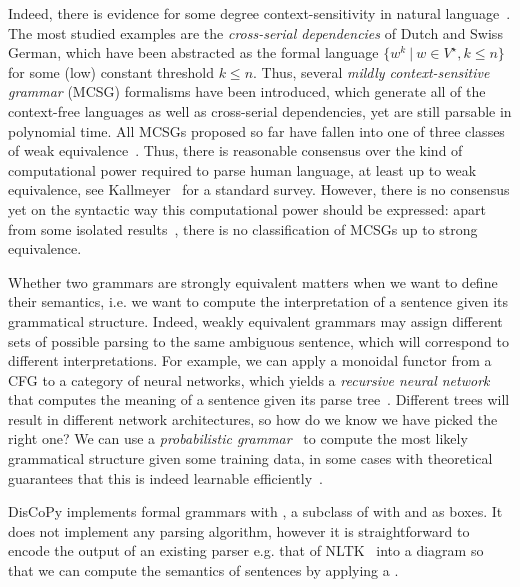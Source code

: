 Indeed, there is evidence for some degree context-sensitivity in natural language~\cite{Huybregts84,Shieber85}.
The most studied examples are the \emph{cross-serial dependencies} of Dutch and Swiss German, which have been abstracted as the formal language $\{ w^k \ \vert \ w \in V^\star, k \leq n \}$ for some (low) constant threshold $k \leq n$.
Thus, several \emph{mildly context-sensitive grammar} (MCSG) formalisms have been introduced, which generate all of the context-free languages as well as cross-serial dependencies, yet are still parsable in polynomial time.
All MCSGs proposed so far have fallen into one of three classes of weak equivalence~\cite{Weir88}.
Thus, there is reasonable consensus over the kind of computational power required to parse human language, at least up to weak equivalence, see Kallmeyer~\cite{Kallmeyer10} for a standard survey.
However, there is no consensus yet on the syntactic way this computational power should be expressed: apart from some isolated results~\cite{SchifferMaletti21}, there is no classification of MCSGs up to strong equivalence.

Whether two grammars are strongly equivalent matters when we want to define their semantics, i.e. we want to compute the interpretation of a sentence given its grammatical structure.
Indeed, weakly equivalent grammars may assign different sets of possible parsing to the same ambiguous sentence, which will correspond to different interpretations.
For example, we can apply a monoidal functor from a CFG to a category of neural networks, which yields a \emph{recursive neural network} that computes the meaning of a sentence given its parse tree~\cite{SocherEtAl11,SocherEtAl13}.
Different trees will result in different network architectures, so how do we know we have picked the right one?
We can use a \emph{probabilistic grammar}~\cite{Salomaa69} to compute the most likely grammatical structure given some training data, in some cases with theoretical guarantees that this is indeed learnable efficiently~\cite{ClarkEtAl06,ShibataYoshinaka16}.

DisCoPy implements formal grammars with , a subclass of  with  and  as boxes.
It does not implement any parsing algorithm, however it is straightforward to encode the output of an existing parser e.g. that of NLTK~\cite{LoperBird02} into a  diagram so that we can compute the semantics of sentences by applying a .

